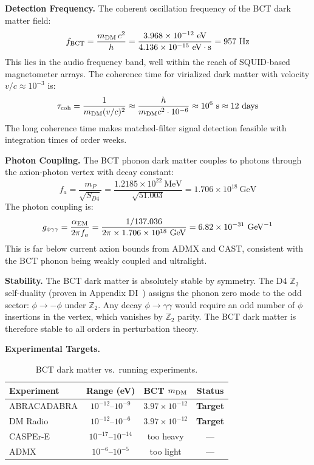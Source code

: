 \documentclass[aps,prl,twocolumn,superscriptaddress,floatfix]{revtex4-2}
\begin{document}
\medskip
\noindent\textbf{Detection Frequency.}
The coherent oscillation frequency of the BCT dark matter field:
\begin{equation}
  f_{\rm BCT} = \frac{m_{\rm DM}\,c^2}{h}
  = \frac{3.968\times10^{-12}\ \mathrm{eV}}{4.136\times10^{-15}\ \mathrm{eV\cdot s}}
  = 957\ \mathrm{Hz}
  \label{eq:fBCT}
\end{equation}
This lies in the audio frequency band, well within the reach of SQUID-based
magnetometer arrays. The coherence time for virialized dark matter
with velocity $v/c \approx 10^{-3}$ is:
\begin{equation}
  \tau_{\rm coh} = \frac{1}{m_{\rm DM}(v/c)^2}
  \approx \frac{h}{m_{\rm DM} c^2 \cdot 10^{-6}}
  \approx 10^6\ \mathrm{s} \approx 12\ \mathrm{days}
  \label{eq:tcoh}
\end{equation}
The long coherence time makes matched-filter signal detection feasible
with integration times of order weeks.

\medskip
\noindent\textbf{Photon Coupling.}
The BCT phonon dark matter couples to photons through the axion-photon
vertex with decay constant:
\begin{equation}
  f_a = \frac{m_P}{\sqrt{S_{D4}}}
  = \frac{1.2185\times10^{22}\ \mathrm{MeV}}{\sqrt{51.003}}
  = 1.706\times10^{18}\ \mathrm{GeV}
  \label{eq:fa}
\end{equation}
The photon coupling is:
\begin{equation}
  g_{\phi\gamma\gamma} = \frac{\alpha_{\rm EM}}{2\pi f_a}
  = \frac{1/137.036}{2\pi \times 1.706\times10^{18}\ \mathrm{GeV}}
  = 6.82\times10^{-31}\ \mathrm{GeV}^{-1}
  \label{eq:gcoupling}
\end{equation}
This is far below current axion bounds from ADMX and CAST,
consistent with the BCT phonon being weakly coupled and ultralight.

\medskip
\noindent\textbf{Stability.}
The BCT dark matter is absolutely stable by symmetry.
The D4 $\mathbb{Z}_2$ self-duality (proven in Appendix DI~\cite{Monograph})
assigns the phonon zero mode to the odd sector: $\phi \to -\phi$ under
$\mathbb{Z}_2$. Any decay $\phi \to \gamma\gamma$ would require an odd number
of $\phi$ insertions in the vertex, which vanishes by $\mathbb{Z}_2$ parity.
The BCT dark matter is therefore stable to all orders in perturbation theory.

\medskip
\noindent\textbf{Experimental Targets.}
\begin{table}[h]
\centering
\caption{BCT dark matter vs.\ running experiments.}
\label{tab:expt}
\begin{tabular}{lccc}
\toprule
Experiment & Range (eV) & BCT $m_{\rm DM}$ & Status \\
\midrule
ABRACADABRA & $10^{-12}$--$10^{-9}$ & $3.97\times10^{-12}$ & \textbf{Target} \\
DM Radio & $10^{-12}$--$10^{-6}$ & $3.97\times10^{-12}$ & \textbf{Target} \\
CASPEr-E & $10^{-17}$--$10^{-14}$ & too heavy & — \\
ADMX & $10^{-6}$--$10^{-5}$ & too light & — \\
\bottomrule
\end{tabular}
\end{table}
\end{document}
